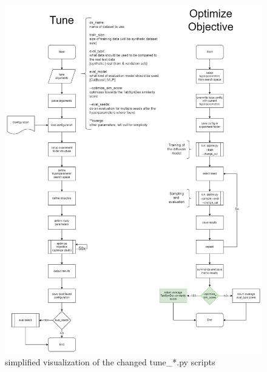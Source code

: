 \begin{figure}[H]
	\centering
	\includegraphics[width=\textwidth]{images/tune_optim-CHANGED.png}
	\caption[Tuning Script Changes]{simplified visualization of the changed tune\_*.py scripts}
\end{figure}


